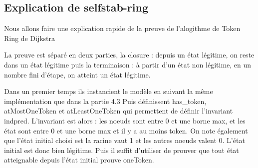 \documentclass[11pt]{article}
\begin{document}
\subsection{Explication de selfstab-ring}
\label{sec:org9656697}
Nous allons faire une explication rapide de la preuve de l'alogithme de Token Ring de Dijkstra

La preuve est séparé en deux parties, la closure : depuis un état légitime, on reste dans un état légitime 
puis la terminaison : à partir d'un état non légitime, en un nombre fini d'étape, on atteint un état légitime.

Dans un premier temps ils instancient le modèle en suivant la même implémentation que dans la partie 4.3
Puis définissent has\_token, atMostOneToken et atLeastOneToken qui permettent de définir l'invariant indpred.
L'invariant est alors : les noeuds sont entre 0 et une borne max, et les état sont entre 0 et une borne max et il y a au moins token.
On note également que l'état initial choisi est la racine vaut 1 et les autres noeuds valent 0.
L'état initial est donc bien légitime.
Puis il suffit d'utiliser de prouver que tout état atteignable depuis l'état initial prouve oneToken.
\end{document}
